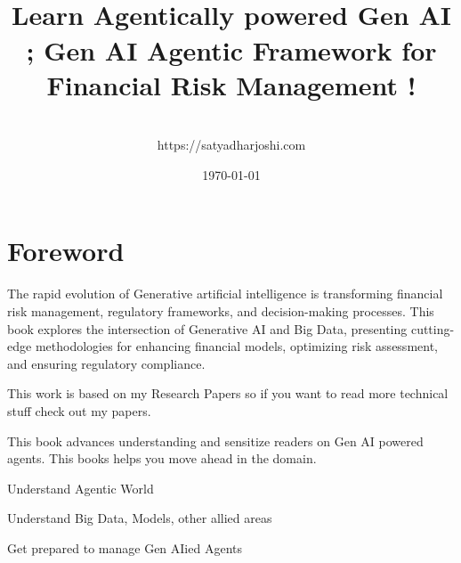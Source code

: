 \documentclass[a4paper,headinclude=on,footinclude=on,12pt,oneside]{scrbook}
\begin{document}
	
	\title{\\\small{Learn Agentically powered Gen AI ;  
			Gen AI Agentic Framework for Financial Risk Management !}}
	\author{
		\\https://satyadharjoshi.com
	}
	\date{\today}
	
	\maketitle
	\tableofcontents
	
	\listoffigures
	
	\listoflistings
	
	\chapter*{Foreword}

	The rapid evolution of Generative artificial intelligence is transforming financial risk management, regulatory frameworks, and decision-making processes. 
	This book explores the intersection of Generative AI and Big Data, presenting cutting-edge methodologies for enhancing financial models, optimizing risk assessment, and ensuring regulatory compliance. 
	
	This work is based on my Research Papers so if you want to read more technical stuff check out my papers. 
	
	
	
	This book advances understanding and sensitize readers on Gen AI powered agents. This books helps you move ahead in the domain.
	
	\begin{arrows}
		\item Understand Agentic World
		\item Understand Big Data, Models, other allied areas
		\item Get prepared to manage Gen AIied Agents 
	\end{arrows}
	
	
\end{document}
